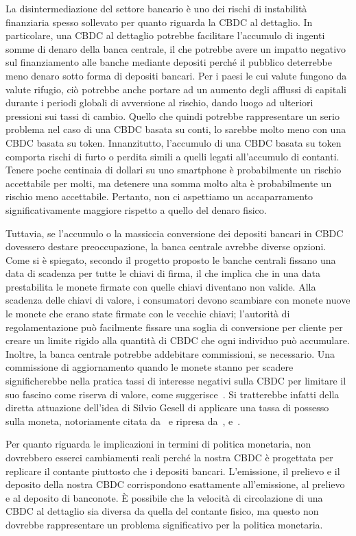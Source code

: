 \documentclass[a4paper]{article}
\begin{document}
La disintermediazione del settore bancario è uno dei rischi di
instabilità finanziaria spesso sollevato per quanto riguarda la CBDC
al dettaglio. In particolare, una CBDC al dettaglio potrebbe
facilitare l'accumulo di ingenti somme di denaro della banca
centrale, il che potrebbe avere un impatto negativo sul finanziamento
alle banche mediante depositi perché il pubblico deterrebbe meno
denaro sotto forma di depositi bancari. Per i paesi le cui valute
fungono da valute rifugio, ciò potrebbe anche portare ad un aumento
degli afflussi di capitali durante i periodi globali di avversione al
rischio, dando luogo ad ulteriori pressioni sui tassi di cambio.
Quello che quindi potrebbe rappresentare un serio problema nel caso di
una CBDC basata su conti, lo sarebbe molto meno con una CBDC basata
su token. Innanzitutto, l'accumulo di una CBDC basata su token comporta
rischi di furto o perdita simili a quelli legati all'accumulo di
contanti. Tenere poche centinaia di dollari su uno smartphone è
probabilmente un rischio accettabile per molti, ma detenere una somma
molto alta è probabilmente un rischio meno accettabile. Pertanto, non
ci aspettiamo un accaparramento significativamente maggiore rispetto a
quello del denaro fisico.

Tuttavia, se l'accumulo o la massiccia conversione dei depositi
bancari in CBDC dovessero destare preoccupazione, la banca centrale
avrebbe diverse opzioni. Come si è spiegato, secondo il progetto
proposto le banche centrali fissano una data di scadenza per tutte le
chiavi di firma, il che implica che in una data prestabilita le monete
firmate con quelle chiavi diventano non valide. Alla scadenza delle
chiavi di valore, i consumatori devono scambiare con monete nuove le
monete che erano state firmate con le vecchie chiavi; l'autorità di
regolamentazione può facilmente fissare una soglia di conversione per
cliente per creare un limite rigido alla quantità di CBDC che ogni
individuo può accumulare. Inoltre, la banca centrale potrebbe addebitare
commissioni, se necessario. Una commissione di aggiornamento quando le monete
stanno per scadere significherebbe nella pratica tassi di interesse negativi
sulla CBDC per limitare il suo fascino come riserva di valore, come
suggerisce~\cite{Bindseil}. Si tratterebbe infatti della diretta attuazione
dell'idea di Silvio Gesell di applicare una tassa di possesso sulla moneta,
notoriamente citata da~\cite{Keynes} e ripresa da~\cite{Goodfriend},
\cite{Buiter} e~\cite{Agarwal}.

Per quanto riguarda le implicazioni in termini di politica monetaria,
non dovrebbero esserci cambiamenti reali perché la nostra CBDC è
progettata per replicare il contante piuttosto che i depositi bancari.
L'emissione, il prelievo e il deposito della nostra CBDC corrispondono
esattamente all'emissione, al prelievo e al deposito di banconote. È
possibile che la velocità di circolazione di una CBDC al dettaglio sia
diversa da quella del contante fisico, ma questo non dovrebbe
rappresentare un problema significativo per la politica monetaria.
\end{document}
